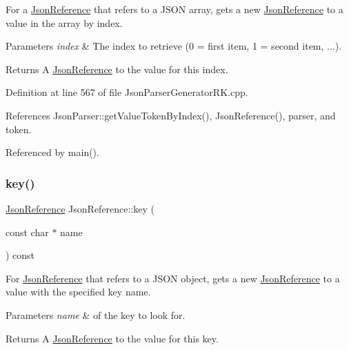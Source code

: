 For a \hyperlink{class_json_reference}{Json\+Reference} that refers to a J\+S\+ON array, gets a new \hyperlink{class_json_reference}{Json\+Reference} to a value in the array by index. 


\begin{DoxyParams}{Parameters}
{\em index} & The index to retrieve (0 = first item, 1 = second item, ...).\\
\hline
\end{DoxyParams}
\begin{DoxyReturn}{Returns}
A \hyperlink{class_json_reference}{Json\+Reference} to the value for this index. 
\end{DoxyReturn}


Definition at line 567 of file Json\+Parser\+Generator\+R\+K.\+cpp.



References Json\+Parser\+::get\+Value\+Token\+By\+Index(), Json\+Reference(), parser, and token.



Referenced by main().

\mbox{\label{class_json_reference_abb7263eb5a84a137f0ed45631993d171}} 
\subsubsection{\texorpdfstring{key()}{key()}}
{\footnotesize\ttfamily \hyperlink{class_json_reference}{Json\+Reference} Json\+Reference\+::key (\begin{DoxyParamCaption}\item[{const char $\ast$}]{name }\end{DoxyParamCaption}) const}



For \hyperlink{class_json_reference}{Json\+Reference} that refers to a J\+S\+ON object, gets a new \hyperlink{class_json_reference}{Json\+Reference} to a value with the specified key name. 


\begin{DoxyParams}{Parameters}
{\em name} & of the key to look for.\\
\hline
\end{DoxyParams}
\begin{DoxyReturn}{Returns}
A \hyperlink{class_json_reference}{Json\+Reference} to the value for this key. 
\end{DoxyReturn}


